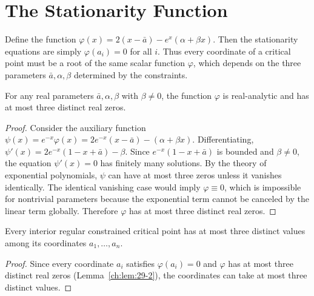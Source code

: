 \section{The Stationarity Function}
Define the function
$\varphi(x) = 2(x-\bar a) - e^{x}(\alpha + \beta x).$
Then the stationarity equations are simply \(\varphi(a_i)=0\) for all \(i\).
Thus every coordinate of a critical point must be a root of the same scalar function \(\varphi\), which depends on the three parameters \(\bar a,\alpha,\beta\) determined by the constraints.
\begin{lemma}
\label{ch:lem:29-2}
For any real parameters \(\bar a,\alpha,\beta\) with \(\beta\neq0\), the function \(\varphi\) is real-analytic and has at most three distinct real zeros.
\end{lemma}
\begin{proof}
Consider the auxiliary function
$\psi(x)=e^{-x}\varphi(x)=2e^{-x}(x-\bar a)-(\alpha+\beta x).$
Differentiating,
$\psi'(x)=2e^{-x}(1-x+\bar a)-\beta.$
Since \(e^{-x}(1-x+\bar a)\) is bounded and \(\beta\neq0\), the equation \(\psi'(x)=0\) has finitely many solutions. By the theory of exponential polynomials, \(\psi\) can have at most three zeros unless it vanishes identically. The identical vanishing case would imply \(\varphi\equiv0\), which is impossible for nontrivial parameters because the exponential term cannot be canceled by the linear term globally. Therefore \(\varphi\) has at most three distinct real zeros. 
\end{proof}
\begin{corollary}
\label{ch:cor:29-1}
Every interior regular constrained critical point has at most three distinct values among its coordinates \(a_1,\ldots,a_n\).
\end{corollary}
\begin{proof}
Since every coordinate \(a_i\) satisfies \(\varphi(a_i)=0\) and \(\varphi\) has at most three distinct real zeros (Lemma~\ref{ch:lem:29-2}), the coordinates can take at most three distinct values. 
\end{proof}
